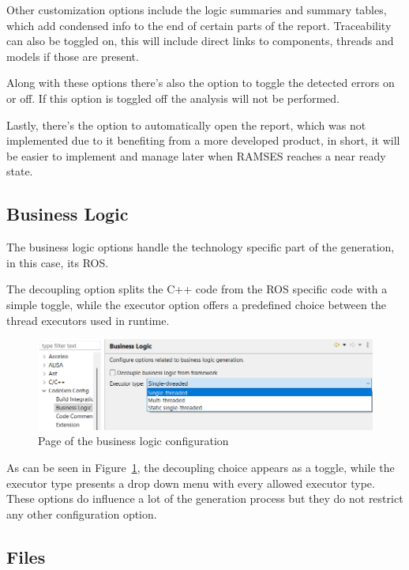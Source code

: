 Other customization options include the logic summaries and summary tables, which add condensed info to the end of certain parts of the report. Traceability can also be toggled on, this will include direct links to components, threads and models if those are present.

Along with these options there's also the option to toggle the detected errors on or off. If this option is toggled off the analysis will not be performed.

Lastly, there's the option to automatically open the report, which was not implemented due to it benefiting from a more developed product, in short, it will be easier to implement and manage later when \gls{RAMSES} reaches a near ready state.


\subsection{Business Logic}
\label{sec:dsl_business_logic}

The business logic options handle the technology specific part of the generation, in this case, its \gls{ROS}. 

The decoupling option splits the C++ code from the \gls{ROS} specific code with a simple toggle, while the executor option offers a predefined choice between the thread executors used in runtime.

\begin{figure}[htbp]
	\centering
	\includegraphics[width=\textwidth]{eclipse_config_business.png}
	\caption{Page of the business logic configuration}
	\label{fig:eclipse_config_business}
\end{figure}

As can be seen in Figure~\ref{fig:eclipse_config_business}, the decoupling choice appears as a toggle, while the executor type presents a drop down menu with every allowed executor type. These options do influence a lot of the generation process but they do not restrict any other configuration option.


\subsection{Files}
\label{sec:dsl_files}

